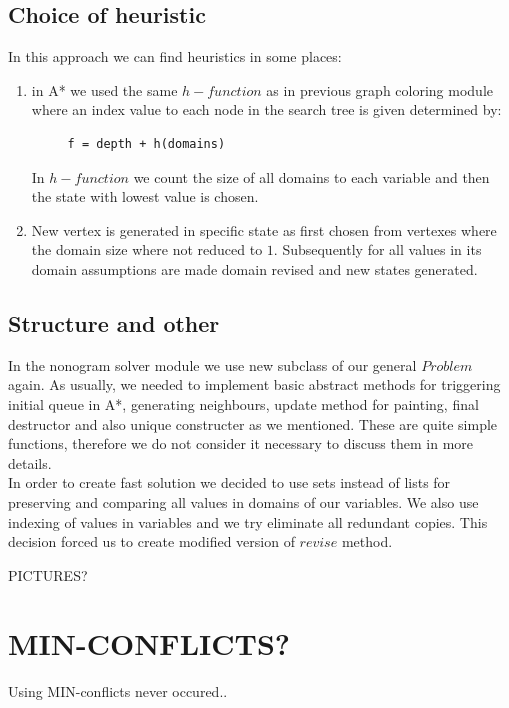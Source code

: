 \documentclass[journal]{IEEEtran}
\begin{document}
\subsection{Choice of heuristic}
In this approach we can find heuristics in some places:
\begin{enumerate}
    \item in A* we used the same $h-function$ as in previous graph coloring module where an index value to each node 
    in the search tree is given determined by:
    \begin{verbatim}
     f = depth + h(domains)
     \end{verbatim}
     In $h-function$ we count the size of all domains to each variable and then the state with lowest value is chosen.\\
    \item New vertex is generated in specific state as first chosen from vertexes where the domain size where not
    reduced to $1$. Subsequently for all values in its domain assumptions are made domain revised and new states
    generated.
\end{enumerate}

\subsection{Structure and other}
In the nonogram solver module we use new subclass of our general $Problem$ again. As usually, we needed 
to implement basic abstract methods for triggering initial queue in A*, generating neighbours, update method for painting, 
final destructor and also unique constructer as we mentioned. These are quite simple functions, therefore we do 
not consider it necessary to discuss them in more details.\\

In order to create fast solution we decided to use sets instead of lists for preserving and comparing all values in 
domains of our variables. We also use indexing of values in variables and we try eliminate all redundant copies. 
This decision forced us to create modified version of $revise$ method.



PICTURES?

\section{MIN-CONFLICTS?}
Using MIN-conflicts never occured..
\end{document}
